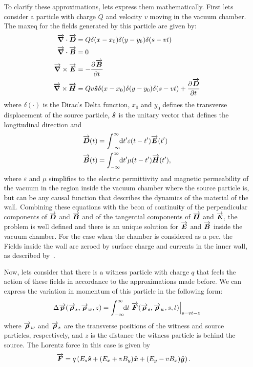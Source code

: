     To clarify these approximations, lets express them mathematically. First lets consider a particle with charge $Q$ and velocity $v$  moving in the vacuum chamber. The \gls{maxeq} for the fields generated by this particle are given by:
    \begin{align}\label{eq:maxeq}
	  	\nonumber
      	\overrightarrow{\boldsymbol{\nabla}}\cdot\overrightarrow{\boldsymbol{D}} &= Q\delta(x-x_0)\delta(y-y_0)\delta(s-vt)\\ \nonumber
	  	\overrightarrow{\boldsymbol{\nabla}}\cdot\overrightarrow{\boldsymbol{B}} &= 0\\
	  	\overrightarrow{\boldsymbol{\nabla}}\times\overrightarrow{\boldsymbol{E}} &= -\frac{\partial^{{}}\overrightarrow{\boldsymbol{B}}}{\partial t^{{}}}\\
	  	\nonumber
	  	\overrightarrow{\boldsymbol{\nabla}}\times\overrightarrow{\boldsymbol{H}} &= Qv\boldsymbol{\hat s}\delta(x-x_0)\delta(y-y_0)\delta(s-vt) + 		\frac{\partial^{{}}\overrightarrow{\boldsymbol{D}}}{\partial t^{{}}}
    \end{align}
    where $\delta(\cdot)$ is the Dirac's Delta function, $x_0$ and $y_0$ defines the transverse displacement of the source particle, $\boldsymbol{\hat s}$ is the unitary vector that defines the longitudinal direction and
    \begin{align}
  	  	\overrightarrow{\boldsymbol{D}}(t) &= \int_{-\infty}^{\infty}\!\!\text{d}t' \varepsilon(t-t')\overrightarrow{\boldsymbol{E}}(t')\\
	  	\overrightarrow{\boldsymbol{B}}(t) &= \int_{-\infty}^{\infty}\!\!\text{d}t' \mu(t-t')\overrightarrow{\boldsymbol{H}}(t'),
    \end{align}
    where $\varepsilon$ and $\mu$ simplifies to the electric permittivity and magnetic permeability of the vacuum in the region inside the vacuum chamber where the source particle is, but can be any causal function that describes the dynamics of the material of the wall. Combining these equations with the \gls{bcon} of continuity of the perpendicular components of $\overrightarrow{\boldsymbol{D}}$ and $\overrightarrow{\boldsymbol{B}}$ and of the tangential components of $\overrightarrow{\boldsymbol{H}}$ and $\overrightarrow{\boldsymbol{E}}$, the problem is well defined and there is an unique solution for $\overrightarrow{\boldsymbol{E}}$ and $\overrightarrow{\boldsymbol{B}}$ inside the vacuum chamber. For the case when the chamber is considered as a \gls{pec}, the Fields inside the wall are zeroed by surface charge and currents in the inner wall, as described by~.

    Now, lets consider that there is a witness particle with charge $q$ that feels the action of these fields in accordance to the approximations made before. We can express the variation in momentum of this particle in the following form:
    \begin{align}\label{eq:momentum_gain}
  	  	\Delta \overrightarrow{\boldsymbol{p}}(\overrightarrow{\boldsymbol{\rho}}_s, \overrightarrow{\boldsymbol{\rho}}_w, z) = \int_{-\infty}^{\infty}\!\!\text{d}t \left.\overrightarrow{\boldsymbol{F}}(\overrightarrow{\boldsymbol{\rho}}_s, \overrightarrow{\boldsymbol{\rho}}_w, s, t)\right|_{s=vt-z}
    \end{align}
    where $\overrightarrow{\boldsymbol{\rho}}_w$ and $\overrightarrow{\boldsymbol{\rho}}_s$ are the transverse positions of the witness and source particles, respectively, and $z$ is the distance the witness particle is behind the source. The Lorentz force in this case is given by
    \begin{align}\label{eq:lorentz_force}
  	  	\overrightarrow{\boldsymbol{F}} &= q\left(E_s\boldsymbol{\hat s} + (E_x+vB_y)\boldsymbol{\hat x} + (E_y-vB_x)\boldsymbol{\hat y}\right).
    \end{align}

